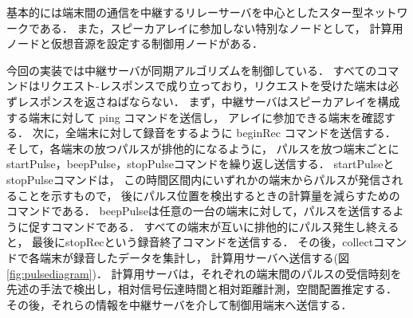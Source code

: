 基本的には端末間の通信を中継するリレーサーバを中心としたスター型ネットワークである．
また，スピーカアレイに参加しない特別なノードとして，
計算用ノードと仮想音源を設定する制御用ノードがある．


今回の実装では中継サーバが同期アルゴリズムを制御している．
すべてのコマンドはリクエスト-レスポンスで成り立っており，リクエストを受けた端末は必ずレスポンスを返さねばならない．
まず，中継サーバはスピーカアレイを構成する端末に対して ping コマンドを送信し，
アレイに参加できる端末を確認する．
次に，全端末に対して録音をするように beginRec コマンドを送信する．
そして，各端末の放つパルスが排他的になるように，
パルスを放つ端末ごとにstartPulse，beepPulse，stopPulseコマンドを繰り返し送信する．
startPulseとstopPulseコマンドは，
この時間区間内にいずれかの端末からパルスが発信されることを示すもので，
後にパルス位置を検出するときの計算量を減らすためのコマンドである．
beepPulseは任意の一台の端末に対して，パルスを送信するように促すコマンドである．
すべての端末が互いに排他的にパルス発生し終えると，
最後にstopRecという録音終了コマンドを送信する．
その後，collectコマンドで各端末が録音したデータを集計し，
計算用サーバへ送信する(図\ref{fig:pulsediagram})．
計算用サーバは，それぞれの端末間のパルスの受信時刻を
先述の手法で検出し，相対信号伝達時間と相対距離計測，空間配置推定する．
その後，それらの情報を中継サーバを介して制御用端末へ送信する．




